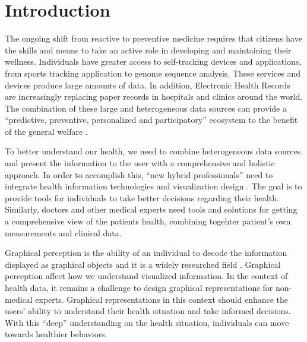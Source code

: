 \documentclass[twocolumn]{bmcart}%
\begin{document}


\section*{Introduction}
The ongoing shift from reactive to preventive medicine requires that citizens have the skills and means to take an active role in developing and maintaining their wellness. Individuals have greater access to self-tracking devices and applications, from sports tracking application to genome sequence analysis. These services and devices produce large amounts of data. In addition, Electronic Health Records are increasingly replacing paper records in hospitals and clinics around the world. The combination of these large and heterogeneous data sources can provide a ``predictive, preventive, personalized and participatory'' ecosystem to the benefit of the general welfare \cite{Hood2012613}.

To better understand our health, we need to combine heterogeneous data sources and present the information to the user with a comprehensive and holistic approach. In order to accomplish this, ``new hybrid professionals'' need to integrate health information technologies and visualization design \cite{lesselroth2011data}. The goal is to provide tools for individuals to take better decisions regarding their health. Similarly, doctors and other medical experts need tools and solutions for getting a comprehensive view of the patients health, combining togehter patient's own measurements and clinical data.

Graphical perception is the ability of an individual to decode the information displayed as graphical objects \cite{baird1978fundamentals} and it is a widely researched field \cite{cleveland1984graphical}. Graphical perception affect how we understand visualized information. In the context of health data, it remains a challenge to design graphical representations for non-medical experts. Graphical representations in this context should enhance the users' ability to understand their health situation and take informed decisions. With this ``deep'' understanding on the health situation, individuals can move towards healthier behaviors.
\end{document}
